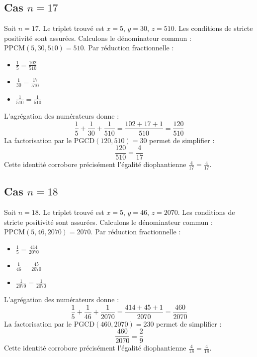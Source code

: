 \documentclass[11pt,a4paper]{article}
\begin{document}
\subsection{Cas $n = 17$}
Soit $n = 17$. Le triplet trouvé est $x = 5$, $y = 30$, $z = 510$.
Les conditions de stricte positivité sont assurées.
Calculons le dénominateur commun : $\text{PPCM}(5, 30, 510) = 510$.
Par réduction fractionnelle :
\begin{itemize}
    \item $\frac{1}{5} = \frac{102}{510}$
    \item $\frac{1}{30} = \frac{17}{510}$
    \item $\frac{1}{510} = \frac{1}{510}$
\end{itemize}
L'agrégation des numérateurs donne :
$$ \frac{1}{5} + \frac{1}{30} + \frac{1}{510} = \frac{102 + 17 + 1}{510} = \frac{120}{510} $$
La factorisation par le $\text{PGCD}(120, 510) = 30$ permet de simplifier :
$$ \frac{120}{510} = \frac{4}{17} $$
Cette identité corrobore précisément l'égalité diophantienne $\frac{4}{17} = \frac{4}{17}$.

\subsection{Cas $n = 18$}
Soit $n = 18$. Le triplet trouvé est $x = 5$, $y = 46$, $z = 2070$.
Les conditions de stricte positivité sont assurées.
Calculons le dénominateur commun : $\text{PPCM}(5, 46, 2070) = 2070$.
Par réduction fractionnelle :
\begin{itemize}
    \item $\frac{1}{5} = \frac{414}{2070}$
    \item $\frac{1}{46} = \frac{45}{2070}$
    \item $\frac{1}{2070} = \frac{1}{2070}$
\end{itemize}
L'agrégation des numérateurs donne :
$$ \frac{1}{5} + \frac{1}{46} + \frac{1}{2070} = \frac{414 + 45 + 1}{2070} = \frac{460}{2070} $$
La factorisation par le $\text{PGCD}(460, 2070) = 230$ permet de simplifier :
$$ \frac{460}{2070} = \frac{2}{9} $$
Cette identité corrobore précisément l'égalité diophantienne $\frac{4}{18} = \frac{4}{18}$.
\end{document}
